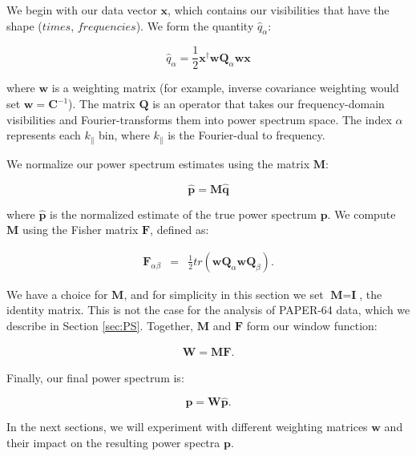 \documentclass[preprint2,numberedappendix,tighten,twocolappendix]{aastex6}  %
\begin{document}
We begin with our data vector $\textbf{x}$, which contains our visibilities that have the shape ($times$, $frequencies$). We form the quantity $\hat{q}_{\alpha}$:

\begin{equation}
\label{eq:qhat}
\hat{q}_{\alpha} = \frac{1}{2}\textbf{x}^{\dagger}\textbf{w}\textbf{Q}_{\alpha}\textbf{w}\textbf{x}
\end{equation}

where $\textbf{w}$ is a weighting matrix (for example, inverse covariance weighting would set $\textbf{w} = \textbf{C}^{-1}$). The matrix $\textbf{Q}$ is an operator that takes our frequency-domain visibilities and Fourier-transforms them into power spectrum space. The index $\alpha$ represents each $k_{\parallel}$ bin, where $k_{\parallel}$ is the Fourier-dual to frequency.

We normalize our power spectrum estimates using the matrix $\textbf{M}$:

\begin{equation}
\hat{\textbf{p}} = \textbf{M}\hat{\textbf{q}}
\end{equation}

where $\hat{\textbf{p}}$ is the normalized estimate of the true power spectrum $\textbf{p}$. We compute $\textbf{M}$ using the Fisher matrix $\textbf{F}$, defined as:

\begin{eqnarray}
\textbf{F}_{\alpha\beta} &=& \frac{1}{2}tr(\textbf{w}\textbf{Q}_{\alpha}\textbf{w}\textbf{Q}_{\beta}). 
\end{eqnarray}

We have a choice for $\textbf{M}$, and for simplicity in this section we set $\textbf{M} = \textbf{I}$, the identity matrix. This is not the case for the analysis of PAPER-64 data, which we describe in Section \ref{sec:PS}. Together, $\textbf{M}$ and $\textbf{F}$ form our window function:

\begin{eqnarray}
\textbf{W} = \textbf{MF}.
\end{eqnarray} 

Finally, our final power spectrum is:

\begin{equation}
\textbf{p} = \textbf{W}\hat{\textbf{p}}.
\end{equation}

In the next sections, we will experiment with different weighting matrices $\textbf{w}$ and their impact on the resulting power spectra $\textbf{p}$.
\end{document}
